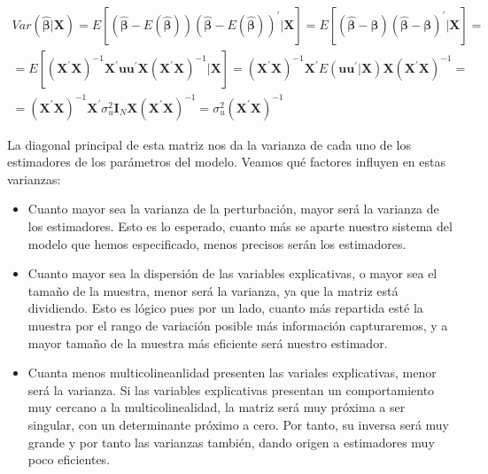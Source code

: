 \begin{equation*}
\begin{array}{c}
Var\left(\hat{\boldsymbol{\beta}}|\boldsymbol{X}\right)=E\left[\left(\hat{\boldsymbol{\beta}}-E\left(\hat{\boldsymbol{\beta}}\right)\right)\left(\hat{\boldsymbol{\beta}}-E\left(\hat{\boldsymbol{\beta}}\right)\right)^{\prime}|\boldsymbol{X}\right]=E\left[\left(\hat{\boldsymbol{\beta}}-\boldsymbol{\beta}\right)\left(\hat{\boldsymbol{\beta}}-\boldsymbol{\beta}\right)^{\prime}|\boldsymbol{X}\right]=\\
=E\left[\left(\boldsymbol{X}^{\prime}\boldsymbol{X}\right)^{-1}\boldsymbol{X}^{\prime}\boldsymbol{u}\boldsymbol{u}^{\prime}\boldsymbol{X}\left(\boldsymbol{X}^{\prime}\boldsymbol{X}\right)^{-1}|\boldsymbol{X}\right]=\left(\boldsymbol{X}^{\prime}\boldsymbol{X}\right)^{-1}\boldsymbol{X}^{\prime}E\left(\boldsymbol{u}\boldsymbol{u}^{\prime}|\boldsymbol{X}\right)\boldsymbol{X}\left(\boldsymbol{X}^{\prime}\boldsymbol{X}\right)^{-1}=\\
=\left(\boldsymbol{X}^{\prime}\boldsymbol{X}\right)^{-1}\boldsymbol{X}^{\prime}\sigma_{u}^{2}\boldsymbol{I}_{N}\boldsymbol{X}\left(\boldsymbol{X}^{\prime}\boldsymbol{X}\right)^{-1}=\sigma_{u}^{2}\left(\boldsymbol{X}^{\prime}\boldsymbol{X}\right)^{-1}
\end{array}
\end{equation*}

La diagonal principal de esta matriz nos da la varianza de cada uno de los estimadores de los par\'ametros del modelo. Veamos qu\'e factores influyen en estas varianzas:

\begin{itemize}
\item Cuanto mayor sea la varianza de la perturbaci\'on, mayor ser\'a la varianza de los estimadores. Esto es lo esperado, cuanto m\'as se aparte nuestro sistema del modelo que hemos especificado, menos precisos ser\'an los estimadores.
\item Cuanto mayor sea la dispersi\'on de las variables explicativas, o mayor sea el tama\~no de la muestra, menor ser\'a la varianza, ya que la matriz est\'a dividiendo. Esto es l\'ogico pues por un lado, cuanto m\'as repartida est\'e la muestra por el rango de variaci\'on posible m\'as informaci\'on capturaremos, y a mayor tama\~no de la muestra m\'as eficiente ser\'a nuestro estimador.
\item Cuanta menos multicolineanlidad presenten las variales explicativas, menor ser\'a la varianza. Si las variables explicativas presentan un comportamiento muy cercano a la multicolinealidad, la matriz ser\'a muy pr\'oxima a ser singular, con un determinante pr\'oximo a cero. Por tanto, su inversa ser\'a muy grande y por tanto las varianzas tambi\'en, dando origen a estimadores muy poco eficientes.
\end{itemize}

